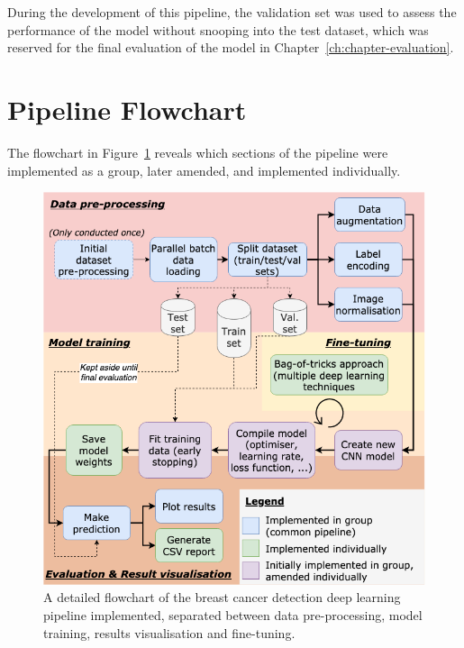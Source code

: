 During the development of this pipeline, the validation set was used to assess the performance of the model without snooping into the test dataset, which was reserved for the final evaluation of the model in Chapter~\ref{ch:chapter-evaluation}.


\section{Pipeline Flowchart}
\label{sec:implementation-detailed-flowchart}

The flowchart in Figure~\ref{fig:implementation-flowchart} reveals which sections of the pipeline were implemented as a group, later amended, and implemented individually.

\begin{figure}[h]
\centerline{\includegraphics[width=\textwidth]{figures/implementation/implementation flowchart.png}}
\caption{\label{fig:implementation-flowchart}A detailed flowchart of the breast cancer detection deep learning pipeline implemented, separated between data pre-processing, model training, results visualisation and fine-tuning.}
\end{figure}


